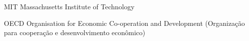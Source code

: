 \begin{siglas}
  \item[MIT] Massachusetts Institute of Technology
  \item[OECD] Organisation for Economic Co-operation and Development (Organização
  para cooperação e desenvolvimento econômico)
\end{siglas}
